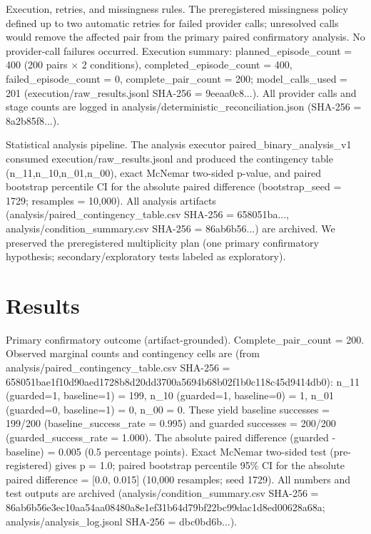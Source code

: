 \documentclass[conference]{IEEEtran}
\begin{document}
Execution, retries, and missingness rules. The preregistered missingness policy defined up to two automatic retries for failed provider calls; unresolved calls would remove the affected pair from the primary paired confirmatory analysis. No provider-call failures occurred. Execution summary: planned\_episode\_count = 400 (200 pairs \ensuremath{\times} 2 conditions), completed\_episode\_count = 400, failed\_episode\_count = 0, complete\_pair\_count = 200; model\_calls\_used = 201 (execution/raw\_results.jsonl SHA-256 = 9eeaa0c8...). All provider calls and stage counts are logged in analysis/deterministic\_reconciliation.json (SHA-256 = 8a2b85f8...).

Statistical analysis pipeline. The analysis executor paired\_binary\_analysis\_v1 consumed execution/raw\_results.jsonl and produced the contingency table (n\_11,n\_10,n\_01,n\_00), exact McNemar two-sided p-value, and paired bootstrap percentile CI for the absolute paired difference (bootstrap\_seed = 1729; resamples = 10,000). All analysis artifacts (analysis/paired\_contingency\_table.csv SHA-256 = 658051ba..., analysis/condition\_summary.csv SHA-256 = 86ab6b56...) are archived. We preserved the preregistered multiplicity plan (one primary confirmatory hypothesis; secondary/exploratory tests labeled as exploratory).

\section{Results}
Primary confirmatory outcome (artifact-grounded). Complete\_pair\_count = 200. Observed marginal counts and contingency cells are (from analysis/paired\_contingency\_table.csv SHA-256 = 658051bae1f10d90aed1728b8d20dd3700a5694b68b02f1b0c118c45d9414db0): n\_11 (guarded=1, baseline=1) = 199, n\_10 (guarded=1, baseline=0) = 1, n\_01 (guarded=0, baseline=1) = 0, n\_00 = 0. These yield baseline successes = 199/200 (baseline\_success\_rate = 0.995) and guarded successes = 200/200 (guarded\_success\_rate = 1.000). The absolute paired difference (guarded - baseline) = 0.005 (0.5 percentage points). Exact McNemar two-sided test (pre-registered) gives p = 1.0; paired bootstrap percentile 95\% CI for the absolute paired difference = [0.0, 0.015] (10,000 resamples; seed 1729). All numbers and test outputs are archived (analysis/condition\_summary.csv SHA-256 = 86ab6b56e3ec10aa54aa08480a8e1ef31b64d79bf22bc99dac1d8ed00628a68a; analysis/analysis\_log.jsonl SHA-256 = dbc0bd6b...).
\end{document}
